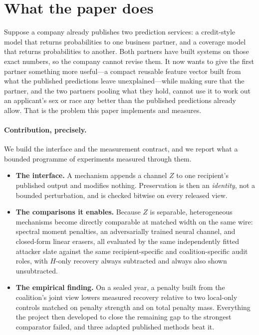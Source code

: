 \documentclass[10pt]{article}
\begin{document}
\section{What the paper does}
\label{sec:contribution}

Suppose a company already publishes two prediction services: a credit-style model that returns
probabilities to one business partner, and a coverage model that returns probabilities to another.
Both partners have built systems on those exact numbers, so the company cannot revise them. It now
wants to give the first partner something more useful---a compact reusable feature vector built from
what the published predictions leave unexplained---while making sure that the partner, and the two
partners pooling what they hold, cannot use it to work out an applicant's sex or race any better than
the published predictions already allow. That is the problem this paper implements and measures.

\paragraph{Contribution, precisely.} We build the interface and the measurement contract, and we
report what a bounded programme of experiments measured through them.

\begin{itemize}\itemsep1pt
\item \textbf{The interface.} A mechanism appends a channel $Z$ to one recipient's published
output and modifies nothing. Preservation is then an \emph{identity}, not a bounded perturbation,
and is checked bitwise on every released view.
\item \textbf{The comparisons it enables.} Because $Z$ is separable, heterogeneous mechanisms become
directly comparable at matched width on the same wire: spectral moment penalties, an adversarially
trained neural channel, and closed-form linear erasers, all evaluated by the same independently
fitted attacker slate against the same recipient-specific and coalition-specific audit roles, with
$H$-only recovery always subtracted and always also shown unsubtracted.
\item \textbf{The empirical finding.} On a sealed year, a penalty built from the coalition's joint
view lowers measured recovery relative to two local-only controls matched on penalty strength and on
total penalty mass. Everything the project then developed to close the remaining gap to the strongest
comparator failed, and three adapted published methods beat it.
\end{itemize}
\end{document}
